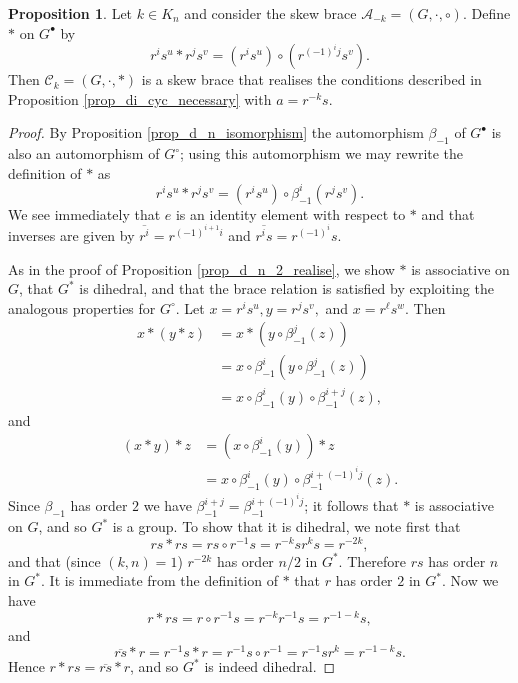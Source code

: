 \documentclass[reqno]{amsart}
\theoremstyle{definition}
\newtheorem{proposition}[theorem]{Proposition}
\renewcommand{\bar}{\overline}
\begin{document}
\begin{proposition} \label{prop_di_cyc_realise}
Let $ k \in K_{n} $ and consider the skew brace $ \mathscr{A}_{-k} = (G,\cdot,\circ) $. Define $ \ast  $ on $ G^{\bullet} $ by
\[ r^{i}s^{u} \ast r^{j}s^{v} = \left( r^{i}s^{u} \right) \circ \left( r^{(-1)^{i}j}s^{v} \right). \]
Then $ \mathscr{C}_{k} = (G,\cdot,\ast) $ is a skew brace that realises the conditions described in Proposition \ref{prop_di_cyc_necessary} with $ a=r^{-k}s $. 
\end{proposition}
\begin{proof}
By Proposition \ref{prop_d_n_isomorphism} the automorphism $ \beta_{-1} $ of $ G^{\bullet} $ is also an automorphism of $ G^{\circ} $; using this automorphism we may rewrite the definition of $ \ast $ as 
\[ r^{i}s^{u} \ast r^{j}s^{v} = \left( r^{i}s^{u} \right) \circ \beta_{-1}^{i}\left( r^{j}s^{v} \right). \]
We see immediately that $ e $ is an identity element with respect to $ \ast $ and that inverses are given by $ \bar{r^{i}} = r^{(-1)^{i+1}i} $ and $ \bar{r^{i}s} = r^{(-1)^{i}}s $. 

As in the proof of Proposition \ref{prop_d_n_2_realise}, we show $ \ast $ is associative on $ G $, that $ G^{\ast} $ is dihedral, and that the brace relation is satisfied by exploiting the analogous properties for $ G^{\circ} $. Let $ x=r^{i}s^{u}, y=r^{j}s^{v}, $ and $ x = r^{\ell}s^{w} $. Then
\begin{align*}
x \ast (y \ast z) &= x \ast (y \circ \beta_{-1}^{j}(z)) \\
&= x \circ \beta_{-1}^{i}(y \circ \beta_{-1}^{j}(z)) \\
&= x \circ \beta_{-1}^{i}(y) \circ \beta_{-1}^{i+j}(z), 
\end{align*}
and
\begin{align*}
(x \ast y) \ast z &= (x \circ \beta_{-1}^{i}(y)) \ast z \\
&= x \circ \beta_{-1}^{i}(y) \circ \beta_{-1}^{i+(-1)^{i}j}(z). 
\end{align*}
Since $ \beta_{-1} $ has order $ 2 $ we have $ \beta_{-1}^{i+j} = \beta_{-1}^{i+(-1)^{i}j} $; it follows that $ \ast $ is associative on $ G $, and so $ G^{\ast} $ is a group. To show that it is dihedral, we note first that 
\[ rs \ast rs = rs \circ r^{-1}s = r^{-k}sr^{k}s = r^{-2k}, \]
and that (since $ (k,n)=1 $) $ r^{-2k} $ has order $ n/2 $ in $ G^{\ast} $. Therefore $ rs $ has order $ n $ in $ G^{\ast} $. It is immediate from the definition of $ \ast $ that $ r $ has order $ 2 $ in $ G^{\ast} $. Now we have
\[ r \ast rs = r \circ r^{-1}s = r^{-k}r^{-1}s = r^{-1-k}s, \]
and
\[ \bar{rs} \ast r = r^{-1}s \ast r = r^{-1}s \circ r^{-1} = r^{-1}sr^{k} = r^{-1-k}s. \]
Hence $ r \ast rs = \bar{rs} \ast r $, and so $ G^{\ast} $ is indeed dihedral. 


\end{proof}
\end{document}
